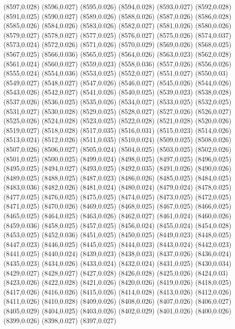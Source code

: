 (8597,0.028)
(8596,0.027)
(8595,0.026)
(8594,0.028)
(8593,0.027)
(8592,0.028)
(8591,0.025)
(8590,0.027)
(8589,0.026)
(8588,0.026)
(8587,0.026)
(8586,0.028)
(8585,0.026)
(8584,0.026)
(8583,0.026)
(8582,0.027)
(8581,0.026)
(8580,0.026)
(8579,0.027)
(8578,0.027)
(8577,0.025)
(8576,0.027)
(8575,0.026)
(8574,0.037)
(8573,0.024)
(8572,0.026)
(8571,0.026)
(8570,0.029)
(8569,0.026)
(8568,0.025)
(8567,0.025)
(8566,0.036)
(8565,0.025)
(8564,0.026)
(8563,0.023)
(8562,0.028)
(8561,0.024)
(8560,0.027)
(8559,0.023)
(8558,0.036)
(8557,0.026)
(8556,0.026)
(8555,0.024)
(8554,0.036)
(8553,0.025)
(8552,0.027)
(8551,0.027)
(8550,0.03)
(8549,0.027)
(8548,0.027)
(8547,0.026)
(8546,0.027)
(8545,0.026)
(8544,0.026)
(8543,0.026)
(8542,0.027)
(8541,0.026)
(8540,0.025)
(8539,0.023)
(8538,0.028)
(8537,0.026)
(8536,0.025)
(8535,0.026)
(8534,0.027)
(8533,0.025)
(8532,0.025)
(8531,0.027)
(8530,0.028)
(8529,0.025)
(8528,0.027)
(8527,0.026)
(8526,0.027)
(8525,0.026)
(8524,0.028)
(8523,0.025)
(8522,0.028)
(8521,0.028)
(8520,0.026)
(8519,0.027)
(8518,0.028)
(8517,0.035)
(8516,0.031)
(8515,0.023)
(8514,0.026)
(8513,0.024)
(8512,0.026)
(8511,0.035)
(8510,0.024)
(8509,0.025)
(8508,0.026)
(8507,0.026)
(8506,0.027)
(8505,0.024)
(8504,0.025)
(8503,0.025)
(8502,0.026)
(8501,0.025)
(8500,0.025)
(8499,0.024)
(8498,0.025)
(8497,0.025)
(8496,0.025)
(8495,0.025)
(8494,0.027)
(8493,0.025)
(8492,0.035)
(8491,0.026)
(8490,0.026)
(8489,0.025)
(8488,0.025)
(8487,0.023)
(8486,0.026)
(8485,0.025)
(8484,0.025)
(8483,0.036)
(8482,0.026)
(8481,0.024)
(8480,0.024)
(8479,0.024)
(8478,0.025)
(8477,0.025)
(8476,0.025)
(8475,0.025)
(8474,0.025)
(8473,0.025)
(8472,0.025)
(8471,0.025)
(8470,0.026)
(8469,0.025)
(8468,0.025)
(8467,0.025)
(8466,0.025)
(8465,0.025)
(8464,0.025)
(8463,0.026)
(8462,0.027)
(8461,0.024)
(8460,0.026)
(8459,0.036)
(8458,0.025)
(8457,0.025)
(8456,0.024)
(8455,0.024)
(8454,0.028)
(8453,0.025)
(8452,0.036)
(8451,0.025)
(8450,0.025)
(8449,0.023)
(8448,0.025)
(8447,0.023)
(8446,0.025)
(8445,0.025)
(8444,0.023)
(8443,0.024)
(8442,0.023)
(8441,0.025)
(8440,0.024)
(8439,0.023)
(8438,0.023)
(8437,0.026)
(8436,0.024)
(8435,0.023)
(8434,0.026)
(8433,0.024)
(8432,0.024)
(8431,0.025)
(8430,0.034)
(8429,0.027)
(8428,0.027)
(8427,0.028)
(8426,0.028)
(8425,0.026)
(8424,0.03)
(8423,0.026)
(8422,0.028)
(8421,0.026)
(8420,0.026)
(8419,0.026)
(8418,0.025)
(8417,0.026)
(8416,0.026)
(8415,0.026)
(8414,0.028)
(8413,0.026)
(8412,0.026)
(8411,0.026)
(8410,0.028)
(8409,0.026)
(8408,0.026)
(8407,0.026)
(8406,0.027)
(8405,0.029)
(8404,0.025)
(8403,0.026)
(8402,0.029)
(8401,0.026)
(8400,0.026)
(8399,0.026)
(8398,0.027)
(8397,0.027)
